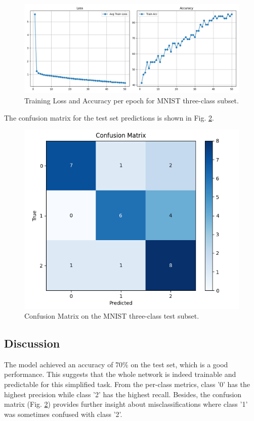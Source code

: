 \documentclass[conference]{IEEEtran}
\begin{document}
\begin{figure}[!ht]
    \centering
    \includegraphics[width=\columnwidth]{mnist_train_stats.png} 
    \caption{Training Loss and Accuracy per epoch for MNIST three-class subset.}
    \label{fig:training_plots} 
\end{figure}

The confusion matrix for the test set predictions is shown in Fig. \ref{fig:confusion_matrix}.

\begin{figure}[!ht]
    \centering
    \includegraphics[width=0.8\columnwidth]{mnist_confusion_matrix.png} 
    \caption{Confusion Matrix on the MNIST three-class test subset.}
    \label{fig:confusion_matrix}
\end{figure}

\subsection{Discussion}
The model achieved an accuracy of 70\% on the test set, which is a good performance. This suggests that the whole network is indeed trainable and predictable for this simplified task. From the per-class metrics, class '0' has the highest precision while class '2' has the highest recall. Besides, the confusion matrix (Fig. \ref{fig:confusion_matrix}) provides further insight about misclassifications where class '1' was sometimes confused with class '2'.
\end{document}

